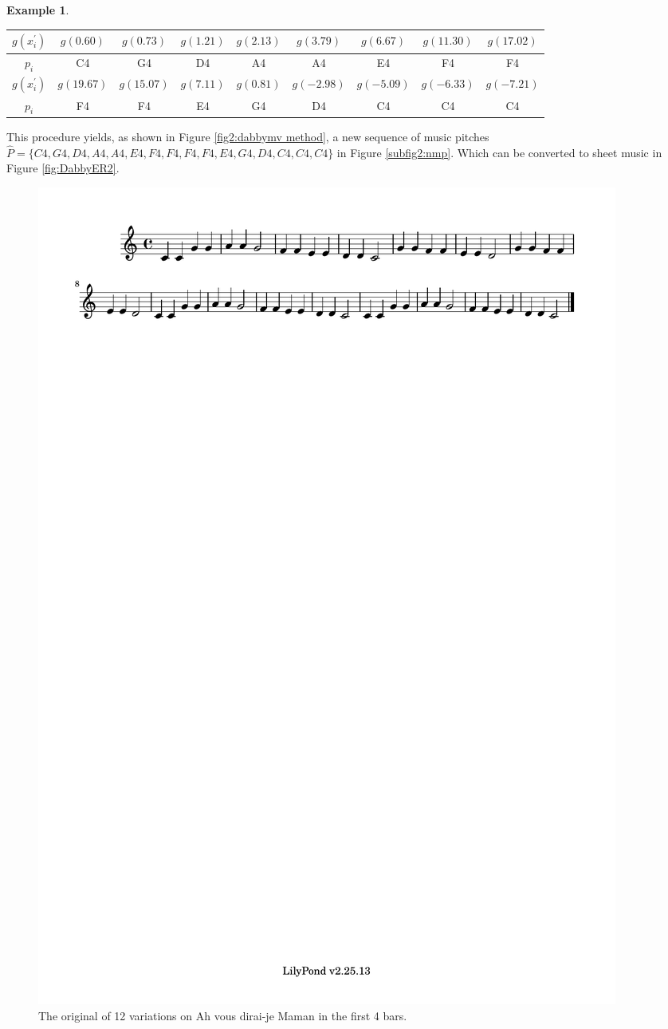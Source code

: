 \documentclass[11pt]{article}
\theoremstyle{definition}
\newtheorem{example}[theorem]{Example}
\begin{document}
\begin{example}
\begin{center}
\begin{tabular}{|c||c|c|c|c|c|c|c|c|}
\hline
$g(x^\prime_i)$ & $g(0.60)$ & $g(0.73)$ & $g(1.21)$ & $g(2.13)$ & $g(3.79)$ & $g(6.67)$ & $g(11.30)$ & $g(17.02)$ \\
\hline
$p_i$ & C4 & G4 & D4 & A4 & A4 & E4 & F4 & F4 \\
\hline
$g(x^\prime_i)$ & $g(19.67)$ & $g(15.07)$ & $g(7.11)$ & $g(0.81)$ & $g(-2.98)$ & $g(-5.09)$ & $g(-6.33)$ & $g(-7.21)$ \\
\hline
$p_i$ & F4 & F4 & E4 & G4 & D4 & C4 & C4 & C4  \\
\hline
\end{tabular}
\end{center}
This procedure yields, as shown in Figure \ref{fig2:dabbymv method}, a new sequence of music pitches \\ $\hat{P} =\{C4, G4, D4, A4, A4, E4, F4, F4, F4, F4, E4, G4, D4, C4, C4, C4 \}$ in Figure \ref{subfig2:nmp}. Which can be converted to sheet music in Figure \ref{fig:DabbyER2}.

\end{example}

\begin{figure}
\centering
\includegraphics[trim=1cm 26.5cm 8.07cm 0.02cm, clip, scale=1]{dabby_1.pdf} %
\caption{The original of 12 variations on Ah vous dirai-je Maman in the first 4 bars.}
\label{fig:DabbyER1} 
\end{figure}
\end{document}
